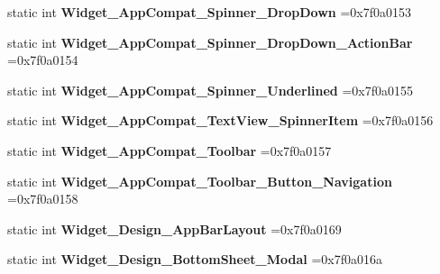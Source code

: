 \begin{DoxyCompactItemize}
\mbox{\label{classandroid_1_1support_1_1v4_1_1R_1_1style_a9b567bf469a99e2a11adba8c4f63b2f1}} 
static int {\bfseries Widget\+\_\+\+App\+Compat\+\_\+\+Spinner\+\_\+\+Drop\+Down} =0x7f0a0153
\item 
\mbox{\label{classandroid_1_1support_1_1v4_1_1R_1_1style_ad80edba320c66c93903bf5a6c08600c7}} 
static int {\bfseries Widget\+\_\+\+App\+Compat\+\_\+\+Spinner\+\_\+\+Drop\+Down\+\_\+\+Action\+Bar} =0x7f0a0154
\item 
\mbox{\label{classandroid_1_1support_1_1v4_1_1R_1_1style_aabb7d6bf1a7fc108184efa39d554d69f}} 
static int {\bfseries Widget\+\_\+\+App\+Compat\+\_\+\+Spinner\+\_\+\+Underlined} =0x7f0a0155
\item 
\mbox{\label{classandroid_1_1support_1_1v4_1_1R_1_1style_a74942f7e5cfb2ab318922676243eb4c3}} 
static int {\bfseries Widget\+\_\+\+App\+Compat\+\_\+\+Text\+View\+\_\+\+Spinner\+Item} =0x7f0a0156
\item 
\mbox{\label{classandroid_1_1support_1_1v4_1_1R_1_1style_a4a488724aa2c3f5e32522efcad1ed5c5}} 
static int {\bfseries Widget\+\_\+\+App\+Compat\+\_\+\+Toolbar} =0x7f0a0157
\item 
\mbox{\label{classandroid_1_1support_1_1v4_1_1R_1_1style_a15bb9203b01606dbff86e4b129f201e2}} 
static int {\bfseries Widget\+\_\+\+App\+Compat\+\_\+\+Toolbar\+\_\+\+Button\+\_\+\+Navigation} =0x7f0a0158
\item 
\mbox{\label{classandroid_1_1support_1_1v4_1_1R_1_1style_ad7ae8010861136e10f0dd609a2ce581a}} 
static int {\bfseries Widget\+\_\+\+Design\+\_\+\+App\+Bar\+Layout} =0x7f0a0169
\item 
\mbox{\label{classandroid_1_1support_1_1v4_1_1R_1_1style_a75f500f925b6a913358d7ec7f32ed695}} 
static int {\bfseries Widget\+\_\+\+Design\+\_\+\+Bottom\+Sheet\+\_\+\+Modal} =0x7f0a016a
\item 

\end{DoxyCompactItemize}
